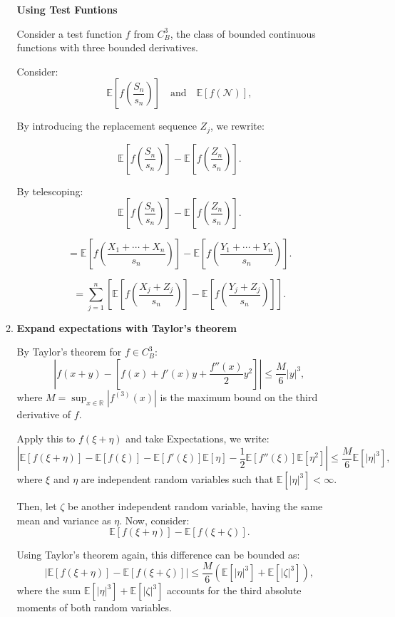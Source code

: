 \begin{itemize}
\begin{enumerate}
\textbf{Using Test Funtions}

Consider a test function \( f \) from \( C^3_B \), the class of bounded continuous functions with three bounded derivatives.

Consider:
\[
\mathbb{E}\left[f\left(\frac{S_n}{s_n}\right)\right] \quad \text{and} \quad \mathbb{E}\left[f\left(\mathcal{N}\right)\right],
\]

By introducing the replacement sequence \( Z_j \), we rewrite:

\[
\mathbb{E}\left[f\left(\frac{S_n}{s_n}\right)\right] - \mathbb{E}\left[f\left(\frac{Z_n}{s_n}\right)\right].
\]

By telescoping:
\[
\mathbb{E}\left[f\left(\frac{S_n}{s_n}\right)\right] - \mathbb{E}\left[f\left(\frac{Z_n}{s_n}\right)\right].
\]

\[
= \mathbb{E}\left[f\left(\frac{X_1 + \cdots + X_n}{s_n}\right)\right] - \mathbb{E}\left[f\left(\frac{Y_1 + \cdots + Y_n}{s_n}\right)\right].
\]

\[
= \sum_{j=1}^n \left[\mathbb{E}\left[f\left(\frac{X_j + Z_j}{s_n}\right)\right] - \mathbb{E}\left[f\left(\frac{Y_j + Z_j}{s_n}\right)\right]\right].
\]

\item \textbf{Expand expectations with Taylor’s theorem}

By Taylor's theorem for \( f \in C^3_B \):
\[
\left|f(x + y) - \left[f(x) + f'(x)y + \frac{f''(x)}{2}y^2\right]\right| \leq \frac{M}{6}|y|^3,
\]
where \( M = \sup_{x \in \mathbb{R}} |f^{(3)}(x)| \) is the maximum bound on the third derivative of \( f \).

Apply this to \( f(\xi + \eta) \) and take Expectations, we write:
\[
\left| \mathbb{E}[f(\xi + \eta)] - \mathbb{E}[f(\xi)] - \mathbb{E}[f'(\xi)]\mathbb{E}[\eta] - \frac{1}{2}\mathbb{E}[f''(\xi)]\mathbb{E}[\eta^2] \right| \leq \frac{M}{6} \mathbb{E}[|\eta|^3],
\]
where \( \xi \) and \( \eta \) are independent random variables such that \(\mathbb{E}[|\eta|^3] < \infty \).

Then, let \( \zeta \) be another independent random variable, having the same mean and variance as \( \eta \). Now, consider:
     \[
     \mathbb{E}[f(\xi + \eta)] - \mathbb{E}[f(\xi + \zeta)].
     \]
     
Using Taylor's theorem again, this difference can be bounded as:
     \[
     \left| \mathbb{E}[f(\xi + \eta)] - \mathbb{E}[f(\xi + \zeta)] \right| \leq \frac{M}{6} (\mathbb{E}[|\eta|^3] + \mathbb{E}[|\zeta|^3]),
     \]
     where the sum \( \mathbb{E}[|\eta|^3] + \mathbb{E}[|\zeta|^3] \) accounts for the third absolute moments of both random variables.


\end{enumerate}
\end{itemize}

